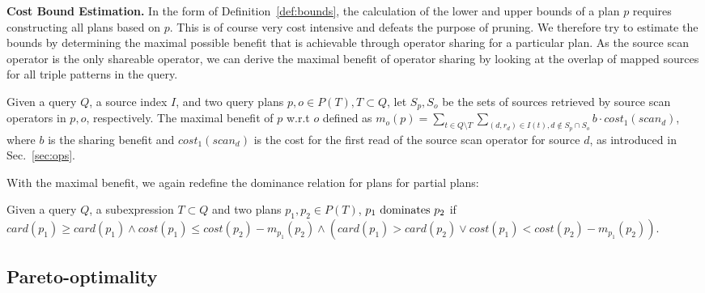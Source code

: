 \textbf{Cost Bound Estimation.} In the form of
Definition~\ref{def:bounds}, the calculation of the lower and upper
bounds of a plan $p$ requires constructing all plans based on
$p$. This is of course very cost intensive and defeats the purpose of
pruning. We therefore try to estimate the bounds by determining the
maximal possible benefit that is achievable through operator sharing
for a particular plan. As the source scan operator is the only
shareable operator, we can derive the maximal benefit of operator
sharing by looking at the overlap of mapped sources for all triple
patterns in the query.

\begin{definition}
  Given a query $Q$, a source index $I$, and two query plans $p,o \in
  P(T), T \subset Q$, let $S_p,S_o$ be the sets of sources retrieved
  by source scan operators in $p,o$, respectively. The maximal benefit
  of $p$ w.r.t $o$ defined as $m_o(p) = \sum_{t \in Q \setminus T}
  \sum_{(d,r_d) \in I(t), d \notin S_p \cap S_o } b \cdot
  cost_1(scan_d)$, where $b$ is the sharing benefit and
  $cost_1(scan_d)$ is the cost for the first read of the source scan
  operator for source $d$, as introduced in Sec.~\ref{sec:ops}.
\end{definition}


With the maximal benefit, we again redefine the dominance relation for
plans for partial plans:

\begin{definition}
  Given a query $Q$, a subexpression $T \subset Q$ and two plans
  $p_1,p_2 \in P(T)$, $p_1 \mbox{ \textnormal{dominates} } p_2$ if
  $card(p_1) \geq card(p_1) \wedge cost(p_1) \leq cost(p_2) -
  m_{p_1}(p_2) \wedge (card(p_1) > card(p_2) \vee cost(p_1) <
  cost(p_2) - m_{p_1}(p_2))$.
\end{definition}


\subsection{Pareto-optimality}
\label{sec:pareto}

